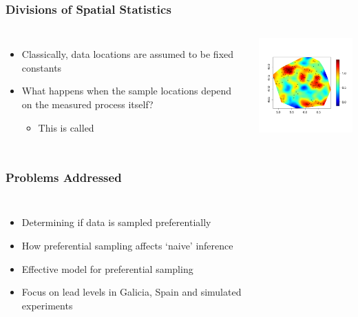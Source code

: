 \documentclass[xcolor=svgnames]{beamer}
\begin{document}
\begin{frame}
\frametitle{Divisions of Spatial Statistics}

\begin{columns}

\column{2.5in}
\begin{itemize}
\setlength\itemsep{.15in}
\item Classically, data locations are assumed to be fixed constants
\item What happens when the sample locations depend on the measured process itself?
\begin{itemize}
\item This is called 
\end{itemize}
\end{itemize}

\column{2.5in}
\begin{center}
\includegraphics[width=2.2in]{GPPPData.pdf}
\end{center}

\end{columns}

\end{frame}
\begin{frame}
\frametitle{Problems Addressed}
\begin{columns}

\column{2.5in}
\begin{itemize}
\setlength\itemsep{.15in}
\item Determining if data is sampled preferentially
\item How preferential sampling affects `naive' inference
\item Effective model for preferential sampling
\item Focus on lead levels in Galicia, Spain and simulated experiments
\end{itemize}

\column{2.5in}
\begin{figure}
\centering
{}
\end{figure}

\end{columns}

\end{frame}
\end{document}
